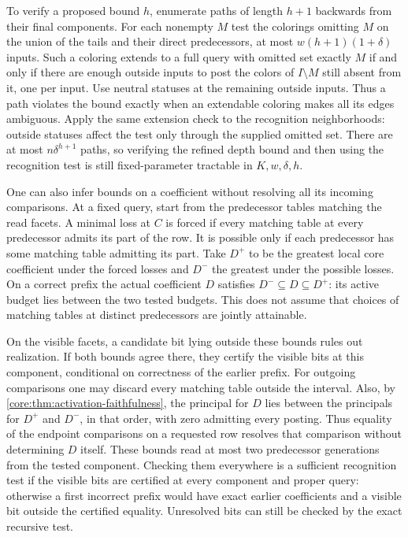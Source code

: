 To verify a proposed bound $h$, enumerate paths
of length $h+1$ backwards from their final
components. For each nonempty $M$ test the colorings
omitting $M$ on the union of the tails and their direct
predecessors, at most $w(h+1)(1+\delta)$ inputs.
Such a coloring extends to a full query with
omitted set exactly $M$ if and only if there are
enough outside inputs to post the colors of
$I\setminus M$ still absent from it, one per input.
Use neutral statuses at the remaining outside inputs.
Thus a path violates the bound exactly when an
extendable coloring makes all its edges ambiguous.
Apply the same extension check to the recognition
neighborhoods: outside statuses affect the test
only through the supplied omitted set. There are at most
$n\delta^{h+1}$ paths, so verifying the refined
depth bound and then using the recognition test
is still fixed-parameter tractable in $K,w,\delta,h$.

One can also infer bounds on a coefficient without
resolving all its incoming comparisons. At a fixed
query, start from the predecessor tables matching
the read facets. A minimal loss at $C$ is forced
if every matching table at every predecessor
admits its part of the row. It is possible only if
each predecessor has some matching table admitting
its part. Take $D^+$ to be the greatest local core
coefficient under the forced losses and $D^-$ the
greatest under the possible losses. On a correct
prefix the actual coefficient $D$ satisfies
$D^-\subseteq D\subseteq D^+$: its active budget
lies between the two tested budgets. This does
not assume that choices of matching tables at
distinct predecessors are jointly attainable.

On the visible facets, a candidate bit lying outside
these bounds rules out realization. If both bounds
agree there, they certify the visible bits at this
component, conditional on correctness of the earlier
prefix. For outgoing comparisons one may discard
every matching table outside the interval. Also,
by \cref{core:thm:activation-faithfulness},
the principal for $D$ lies between the principals
for $D^+$ and $D^-$, in that order, with zero
admitting every posting. Thus equality of the
endpoint comparisons on a requested row resolves
that comparison without determining $D$ itself.
These bounds read at most two predecessor generations
from the tested component. Checking them everywhere
is a sufficient recognition test if the visible bits
are certified at every component and proper query:
otherwise a first incorrect prefix would have exact
earlier coefficients and a visible bit outside the
certified equality. Unresolved bits can still be
checked by the exact recursive test.

